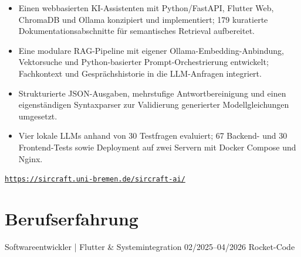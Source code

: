 \begin{itemize}

    \item Einen webbasierten KI-Assistenten mit
    Python/FastAPI, Flutter Web,
    ChromaDB und Ollama
    konzipiert und implementiert;
    179 kuratierte Dokumentationsabschnitte
    für semantisches Retrieval aufbereitet.

    \item Eine modulare RAG-Pipeline
    mit eigener Ollama-Embedding-Anbindung,
    Vektorsuche und Python-basierter
    Prompt-Orchestrierung entwickelt;
    Fachkontext und Gesprächshistorie
    in die LLM-Anfragen integriert.

    \item Strukturierte JSON-Ausgaben,
    mehrstufige Antwortbereinigung und einen
    eigenständigen Syntaxparser zur Validierung
    generierter Modellgleichungen umgesetzt.

    \item Vier lokale LLMs
    anhand von 30 Testfragen evaluiert;
    67 Backend- und 30 Frontend-Tests
    sowie Deployment auf zwei Servern
    mit Docker Compose und Nginx.

\end{itemize}

    {\small
\href{https://sircraft.uni-bremen.de/sircraft-ai/}
{\nolinkurl{https://sircraft.uni-bremen.de/sircraft-ai/}}
}
\par


\section{Berufserfahrung}

\cvitem
{Softwareentwickler | Flutter \& Systemintegration}
{02/2025--04/2026}
{Rocket-Code}

